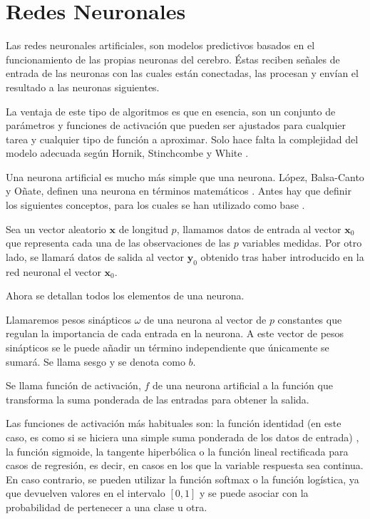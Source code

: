 \newpage
\section{Redes Neuronales}

\noindent Las redes neuronales artificiales, son modelos predictivos basados en el funcionamiento de las propias neuronas del cerebro. Éstas reciben señales de entrada de las neuronas con las cuales están conectadas, las procesan y envían el resultado a las  neuronas siguientes. 

\noindent La ventaja de este tipo de algoritmos es que en esencia, son un conjunto de parámetros y funciones de activación que pueden ser ajustados para cualquier tarea y cualquier tipo de función a aproximar. Solo hace falta la complejidad del modelo adecuada según Hornik, Stinchcombe y  White \cite{Hornik 1989}.  

\noindent Una neurona artificial es mucho más simple que una neurona. López,  Balsa-Canto y  Oñate, definen una neurona en términos matemáticos \cite{Roberto 2008}. Antes hay que definir los siguientes conceptos, para los cuales se han utilizado como base \cite{Grossi 2007, Neural Designer}.

\noindent Sea un vector aleatorio $\mathbf{x}$ de longitud $p$, llamamos datos de entrada al vector $\mathbf{x}_0$ que representa cada una de las observaciones de las $p$  variables medidas. Por otro lado, se llamará datos de salida al vector $\mathbf{y}_0$ obtenido tras haber introducido en la red neuronal el vector $\mathbf{x}_0$.

\noindent Ahora se detallan todos los elementos de una neurona. 

\begin{defi}
Llamaremos pesos sinápticos $\omega$ de una neurona al vector de $p$ constantes que regulan la importancia de cada entrada en la neurona.  A este vector de pesos sinápticos se le puede añadir un término independiente que únicamente se sumará. Se llama sesgo y se denota como $b$.
\end{defi}

\begin{defi}
Se llama función de activación, $f$ de una neurona artificial a la función que transforma la suma ponderada de las entradas para obtener la salida. 

\noindent Las funciones de activación más habituales son: la función identidad (en este caso, es como si se hiciera una simple suma ponderada de los datos de entrada) , la función sigmoide, la tangente hiperbólica o la función lineal rectificada para casos de regresión, es decir, en casos en los que la variable respuesta sea continua. En caso contrario, se pueden utilizar la función softmax o la función logística, ya que devuelven valores en el intervalo $[0,1]$ y se puede asociar con la probabilidad de pertenecer a una clase u otra. 
\end{defi}

